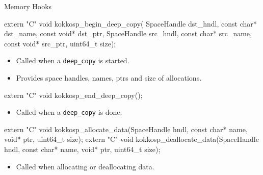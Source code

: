 \begin{frame}[fragile]{Memory Hooks}
\begin{code}[keywords={extern,void,int,uint64_t,uint32_t,const,char}]
extern "C" void kokkosp_begin_deep_copy(
  SpaceHandle dst_hndl, const char* dst_name, const void* dst_ptr,
  SpaceHandle src_hndl, const char* src_name, const void* src_ptr,
  uint64_t size);
\end{code}
\begin{itemize}
  \item Called when a \texttt{deep\_copy} is started.
  \item Provides space handles, names, ptrs and size of allocations.
\end{itemize}

\begin{code}[keywords={extern,void,int,uint64_t,uint32_t,const,char}]
extern "C" void kokkosp_end_deep_copy();
\end{code}
\begin{itemize}
  \item Called when a \texttt{deep\_copy} is done.
\end{itemize}

\begin{code}[keywords={extern,void,int,uint64_t,uint32_t,const,char}]
extern "C" void kokkosp_allocate_data(SpaceHandle hndl,
  const char* name, void* ptr, uint64_t size);
extern "C" void kokkosp_deallocate_data(SpaceHandle hndl,
  const char* name, void* ptr, uint64_t size);
\end{code}
\begin{itemize}
  \item Called when allocating or deallocating data.
\end{itemize}
\end{frame}


